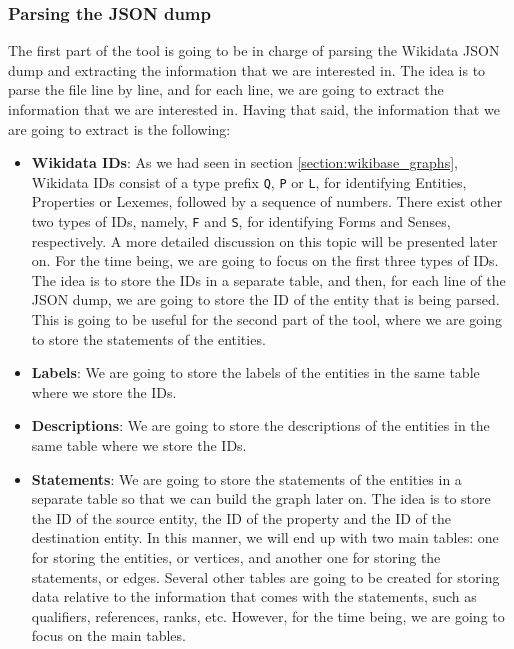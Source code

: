 \subsubsection{Parsing the JSON dump}

The first part of the tool is going to be in charge of parsing the Wikidata JSON dump and extracting the information that we are interested in. The idea is to parse the file line by line, and for each line, we are going to extract the information that we are interested in. Having that said, the information that we are going to extract is the following:

\begin{itemize}
    \itemsep0.5em
    \item \textbf{Wikidata IDs}: As we had seen in section \ref{section:wikibase_graphs}, Wikidata IDs consist of a type prefix \texttt{Q}, \texttt{P} or \texttt{L}, for identifying Entities, Properties or Lexemes, followed by a sequence of numbers. There exist other two types of IDs, namely, \texttt{F} and \texttt{S}, for identifying Forms and Senses, respectively. A more detailed discussion on this topic will be presented later on. For the time being, we are going to focus on the first three types of IDs. The idea is to store the IDs in a separate table, and then, for each line of the JSON dump, we are going to store the ID of the entity that is being parsed. This is going to be useful for the second part of the tool, where we are going to store the statements of the entities.
    \item \textbf{Labels}: We are going to store the labels of the entities in the same table where we store the IDs.
    \item \textbf{Descriptions}: We are going to store the descriptions of the entities in the same table where we store the IDs.
    \item \textbf{Statements}: We are going to store the statements of the entities in a separate table so that we can build the graph later on. The idea is to store the ID of the source entity, the ID of the property and the ID of the destination entity. In this manner, we will end up with two main tables: one for storing the entities, or vertices, and another one for storing the statements, or edges. Several other tables are going to be created for storing data relative to the information that comes with the statements, such as qualifiers, references, ranks, etc. However, for the time being, we are going to focus on the main tables.
\end{itemize}

